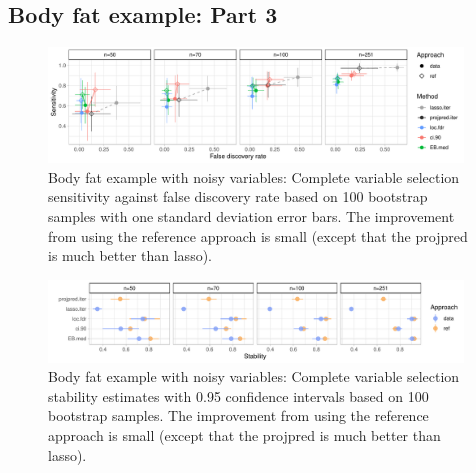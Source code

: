 \documentclass[a4]{article}
\theoremstyle{definition}
\begin{document}
\hypertarget{bodyfat-2}{%
\subsection{Body fat example: Part 3}\label{bodyfat-3}}

\begin{figure}[tp]
  \centering
  \includegraphics[width=0.98\textwidth]{graphics/bodyfat_sensitivity_vs_fdr.pdf}
  \vspace{-0.3\baselineskip}
  \caption{Body fat example with noisy variables: Complete variable selection sensitivity against false discovery rate based on 100 bootstrap samples with one standard deviation error bars. The improvement from using the reference approach is small (except that the projpred is much better than lasso).}
  \label{fig:bodyfat_sensitivity_vs_fdr}
\end{figure}
\begin{figure}[tp]
  \centering
  \includegraphics[width=0.98\textwidth]{graphics/bodyfat_stability.pdf}
  \vspace{-0.3\baselineskip}
  \caption{Body fat example with noisy variables: Complete variable selection stability estimates with 0.95 confidence intervals based on 100 bootstrap samples. The improvement from using the reference approach is small (except that the projpred is much better than lasso).}
  \label{fig:bodyfat_stability}
\end{figure}
\end{document}
